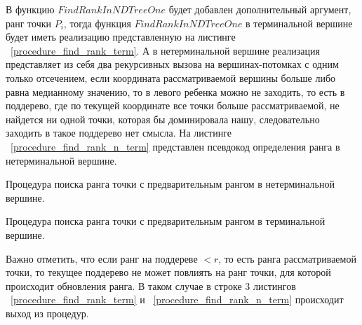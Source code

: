 В функцию $FindRankInNDTreeOne$ будет добавлен дополнительный аргумент, ранг точки $P_i$, тогда функция $FindRankInNDTreeOne$ в терминальной вершине будет иметь реализацию представленную на листинге ~\ref{procedure_find_rank_term}. А в нетерминальной вершине реализация представляет из себя два рекурсивных вызова на вершинах-потомках с одним только отсечением, если координата рассматриваемой вершины больше либо равна медианному значению, то в левого ребенка можно не заходить, то есть в поддерево, где по текущей координате все точки больше рассматриваемой, не найдется ни одной точки, которая бы доминировала нашу, следовательно заходить в такое поддерево нет смысла. На листинге ~\ref{procedure_find_rank_n_term} представлен псевдокод определения ранга в нетерминальной вершине.

\begin{algorithm}
\begin{algorithmic}[1]
    \EndIf

    \EndIf
    
\EndProcedure
\end{algorithmic}
\caption{Процедура поиска ранга точки с предварительным рангом в нетерминальной вершине.}
\label{procedure_find_rank_n_term}
\end{algorithm}

\begin{algorithm}
\begin{algorithmic}[1]
    \EndIf
        \EndIf
    \EndFor
\EndProcedure
\end{algorithmic}
\caption{Процедура поиска ранга точки с предварительным рангом в терминальной вершине.}
\label{procedure_find_rank_term}
\end{algorithm}

Важно отметить, что если ранг на поддереве $< r$, то есть ранга рассматриваемой точки, то текущее поддерево не может повлиять на ранг точки, для которой происходит обновления ранга. В таком случае в строке 3 листингов ~\ref{procedure_find_rank_term} и ~\ref{procedure_find_rank_n_term} происходит выход из процедур.

